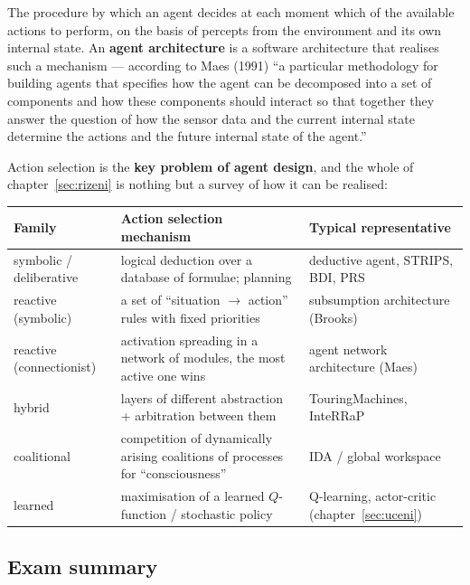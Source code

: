 \documentclass[11pt,a4paper]{article}
\theoremstyle{definition}
\providecommand{\uv}[1]{``#1''}
\begin{document}
\begin{defbox}
The procedure by which an agent decides at each moment which of the available actions to perform,
on the basis of percepts from the environment and its own internal state. An \textbf{agent
architecture} is a software architecture that realises such a mechanism --- according to Maes
(1991) \uv{a particular methodology for building agents that specifies how the agent can be
decomposed into a set of components and how these components should interact so that together they
answer the question of how the sensor data and the current internal state determine the actions and
the future internal state of the agent.}
\end{defbox}

Action selection is the \textbf{key problem of agent design}, and the whole of
chapter~\ref{sec:rizeni} is nothing but a survey of how it can be realised:

\begin{center}
\small
\begin{tabular}{p{} p{} p{}}
\toprule
\textbf{Family} & \textbf{Action selection mechanism} & \textbf{Typical representative} \\
\midrule
symbolic / deliberative
  & logical deduction over a database of formulae; planning
  & deductive agent, STRIPS, BDI, PRS \\
reactive (symbolic)
  & a set of \uv{situation $\to$ action} rules with fixed priorities
  & subsumption architecture (Brooks) \\
reactive (connectionist)
  & activation spreading in a network of modules, the most active one wins
  & agent network architecture (Maes) \\
hybrid
  & layers of different abstraction + arbitration between them
  & TouringMachines, InteRRaP \\
coalitional
  & competition of dynamically arising coalitions of processes for \uv{consciousness}
  & IDA / global workspace \\
learned
  & maximisation of a learned $Q$-function / stochastic policy
  & Q-learning, actor-critic (chapter~\ref{sec:uceni}) \\
\bottomrule
\end{tabular}
\end{center}


\subsection{Exam summary}
\end{document}
